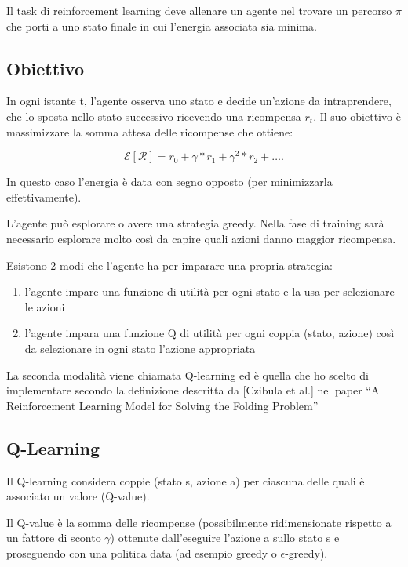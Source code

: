 \documentclass[conference]{IEEEtran}
\begin{document}
Il task di reinforcement learning deve allenare un agente nel trovare un percorso $\pi$ che porti a uno stato finale in cui l'energia associata sia minima.

\subsection{Obiettivo}

In ogni istante t, l'agente osserva uno stato e decide un'azione da intraprendere, che lo sposta nello stato successivo ricevendo una ricompensa $r_t$. Il suo obiettivo è massimizzare la somma attesa delle ricompense che ottiene:

\begin{equation}
\mathcal{E}[\mathcal{R}] = r_0 + \gamma*r_1 + \gamma^2*r_2 + \dots.
\end{equation}

In questo caso l'energia è data con segno opposto (per minimizzarla effettivamente).

L'agente può esplorare o avere una strategia greedy. Nella fase di training sarà necessario esplorare molto così da capire quali azioni danno maggior ricompensa.

Esistono 2 modi che l'agente ha per imparare una propria strategia:

\begin{enumerate}
 \item l'agente impare una funzione di utilità per ogni stato e la usa per selezionare le azioni
 \item l'agente impara una funzione Q di utilità per ogni coppia (stato, azione) così da selezionare in ogni stato l'azione appropriata
\end{enumerate}

La seconda modalità viene chiamata Q-learning ed è quella che ho scelto di implementare secondo la definizione descritta da [Czibula et al.] nel paper ``A Reinforcement Learning Model for Solving the Folding Problem''

\subsection{Q-Learning}

Il Q-learning considera coppie (stato s, azione a) per ciascuna delle quali è associato un valore (Q-value).

Il Q-value è la somma delle ricompense (possibilmente ridimensionate rispetto a un fattore di sconto $\gamma$) ottenute dall'eseguire l'azione a sullo stato s e proseguendo con una politica data (ad esempio greedy o $\epsilon$-greedy).
\end{document}
